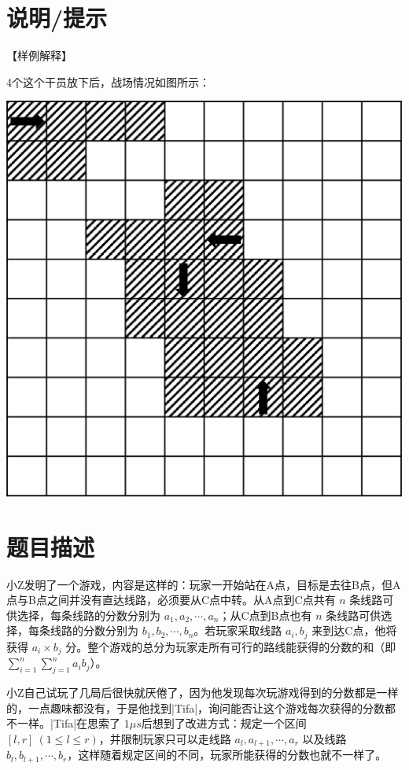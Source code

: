 \documentclass{ctpro}
\begin{document}
\section*{说明/提示}
【样例解释】

4个这个干员放下后，战场情况如图所示：

\begin{center}
	\includegraphics{images/battlefield.png}
\end{center}

\makeproblem
\section*{题目描述}
小Z发明了一个游戏，内容是这样的：玩家一开始站在A点，目标是去往B点，但A点与B点之间并没有直达线路，必须要从C点中转。从A点到C点共有 $n$ 条线路可供选择，每条线路的分数分别为 $a_1, a_2, \cdots, a_n$；从C点到B点也有 $n$ 条线路可供选择，每条线路的分数分别为 $b_1, b_2, \cdots, b_n$。若玩家采取线路 $a_i, b_j$ 来到达C点，他将获得 $a_i \times b_j$ 分。整个游戏的总分为玩家走所有可行的路线能获得的分数的和（即 $\sum_{i=1}^n \sum_{j=1}^n a_i b_j$）。

小Z自己试玩了几局后很快就厌倦了，因为他发现每次玩游戏得到的分数都是一样的，一点趣味都没有，于是他找到|Tifa|，询问能否让这个游戏每次获得的分数都不一样。|Tifa|在思索了 $1 \mu s$后想到了改进方式：规定一个区间 $[l,r]~(1 \leq l \leq r)$，并限制玩家只可以走线路 $a_l, a_{l+1}, \cdots, a_r$ 以及线路 $b_l, b_{l+1}, \cdots, b_r$，这样随着规定区间的不同，玩家所能获得的分数也就不一样了。
\end{document}
